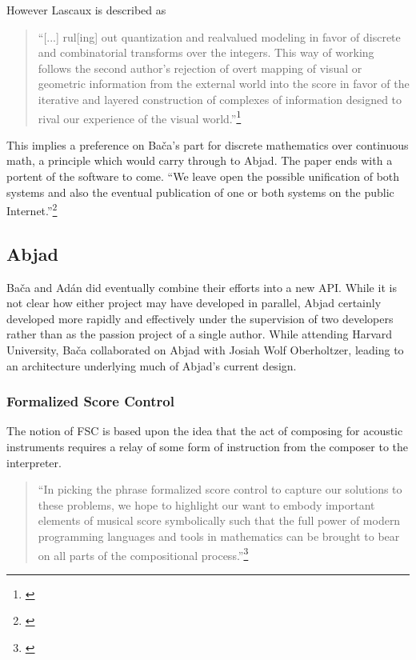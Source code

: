 However Lascaux is described as

\begin{quote}
\singlespacing
``[...] rul[ing] out quantization and realvalued modeling in favor of discrete and combinatorial transforms over the integers. This way of working follows the second author’s rejection of overt mapping of visual or geometric information from the external world into the score in favor of the iterative and layered construction of complexes of information designed to rival our experience of the visual world.''\footnote{\citet[p.12]{lascaux}}
\end{quote}

This implies a preference on Ba\v{c}a's part for discrete mathematics over continuous math, a principle which would carry through to Abjad. The paper ends with a portent of the software to come. ``We leave open the possible unification of both systems and also the eventual publication of one or both systems on the public Internet.''\footnote{\citet[p.12]{lascaux}}

\subsection{Abjad}

Ba\v{c}a and Ad\'{a}n did eventually combine their efforts into a new \ac{API}. While it is not clear how either project may have developed in parallel, Abjad certainly developed more rapidly and effectively under the supervision of two developers rather than as the passion project of a single author. While attending Harvard University, Ba\v{c}a collaborated on Abjad with Josiah Wolf Oberholtzer, leading to an architecture underlying much of Abjad's current design.

\subsubsection{Formalized Score Control}

The notion of \ac{FSC} is based upon the idea that the act of composing for acoustic instruments requires a relay of some form of instruction from the composer to the interpreter.

\begin{quote}
\singlespacing
``In picking the phrase formalized score control to capture our solutions to these problems, we hope to highlight our want to embody important elements of musical score symbolically such that the full power of modern programming languages and tools in mathematics can be brought to bear on all parts of the compositional process.''\footnote{\citet{abjadwebsite}}
\end{quote}

